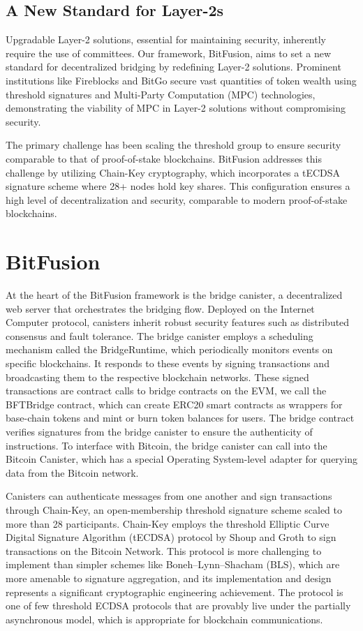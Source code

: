 \documentclass{article}
\begin{document}
\subsection{A New Standard for Layer-2s}

Upgradable Layer-2 solutions, essential for maintaining security, inherently require the use of committees. Our framework, BitFusion, aims to set a new standard for decentralized bridging by redefining Layer-2 solutions. Prominent institutions like Fireblocks and BitGo secure vast quantities of token wealth using threshold signatures and Multi-Party Computation (MPC) technologies, demonstrating the viability of MPC in Layer-2 solutions without compromising security.

The primary challenge has been scaling the threshold group to ensure security comparable to that of proof-of-stake blockchains. BitFusion addresses this challenge by utilizing Chain-Key cryptography, which incorporates a tECDSA signature scheme where 28+ nodes hold key shares. This configuration ensures a high level of decentralization and security, comparable to modern proof-of-stake blockchains.

\section{BitFusion}

At the heart of the BitFusion framework is the bridge canister, a decentralized web server that orchestrates the bridging flow. Deployed on the Internet Computer protocol, canisters inherit robust security features such as distributed consensus and fault tolerance. The bridge canister employs a scheduling mechanism called the BridgeRuntime, which periodically monitors events on specific blockchains. It responds to these events by signing transactions and broadcasting them to the respective blockchain networks. These signed transactions are contract calls to bridge contracts on the EVM, we call the BFTBridge contract, which can create ERC20 smart contracts as wrappers for base-chain tokens and mint or burn token balances for users. The bridge contract verifies signatures from the bridge canister to ensure the authenticity of instructions. To interface with Bitcoin, the bridge canister can call into the Bitcoin Canister, which has a special Operating System-level adapter for querying data from the Bitcoin network. 

Canisters can authenticate messages from one another and sign transactions through Chain-Key, an open-membership threshold signature scheme scaled to more than 28 participants. Chain-Key employs the threshold Elliptic Curve Digital Signature Algorithm (tECDSA) protocol by Shoup and Groth \cite{tECDSA} to sign transactions on the Bitcoin Network. This protocol is more challenging to implement than simpler schemes like Boneh–Lynn–Shacham (BLS), which are more amenable to signature aggregation, and its implementation and design represents a significant cryptographic engineering achievement. The  protocol is one of few threshold ECDSA protocols that are provably live under the partially asynchronous model, which is appropriate for blockchain communications. 
\end{document}
